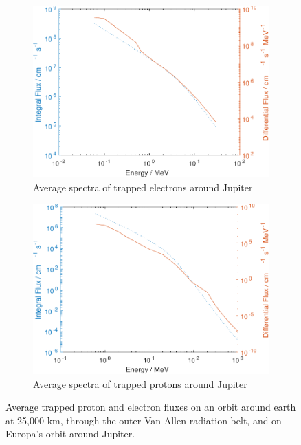 \begin{figure}[htb]
\begin{subfigure}[b]{0.49\textwidth}
         \centering
         \includegraphics[width=\textwidth]{Media/J_Electron_Flux}
         \caption{Average spectra of trapped electrons around Jupiter}
         \label{fig:trappedelectronsJupiter}
     \end{subfigure}
     \hfill
     \begin{subfigure}[b]{0.49\textwidth}
         \centering
         \includegraphics[width=\textwidth]{Media/J_Proton_Flux}
         \caption{Average spectra of trapped protons around Jupiter}
         \label{fig:trappedprotonsJupiter}
     \end{subfigure}
     \caption{Average trapped proton and electron fluxes on an orbit around earth at 25,000 km, through the outer Van Allen radiation belt, and on Europa's orbit around Jupiter.}
     \label{fig:trappedprotonelectronfluxes}
\end{figure}

